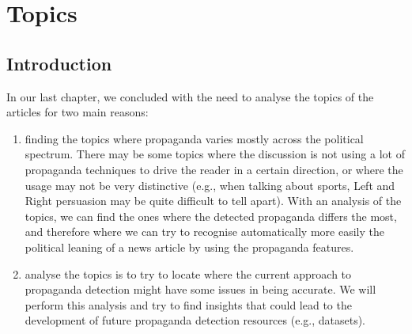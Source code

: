 \chapter{\statusorange Topics}
\label{chap:topics}

\section{Introduction}






In our last chapter, we concluded with the need to analyse the topics of the articles for two main reasons:

\begin{enumerate}
    \item finding the topics where propaganda varies mostly across the political spectrum. There may be some topics where the discussion is not using a lot of propaganda techniques to drive the reader in a certain direction, or where the usage may not be very distinctive (e.g., when talking about sports, Left and Right persuasion may be quite difficult to tell apart). With an analysis of the topics, we can find the ones where the detected propaganda differs the most, and therefore where we can try to recognise automatically more easily the political leaning of a news article by using the propaganda features.
    \item analyse the topics is to try to locate where the current approach to propaganda detection might have some issues in being accurate. We will perform this analysis and try to find insights that could lead to the development of future propaganda detection resources (e.g., datasets).
\end{enumerate}

